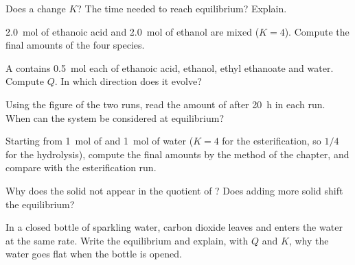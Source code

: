 \begin{exercise}[$\star$]\label{exo:g12:equilibrium:5}
Does a  change $K$? The time needed to reach equilibrium? Explain.
\end{exercise}

\begin{exercise}[$\star\star$]\label{exo:g12:equilibrium:6}
\qty{2.0}{mol} of ethanoic acid and \qty{2.0}{mol} of ethanol are mixed
($K = 4$). Compute the final amounts of the four species.
\end{exercise}

\begin{exercise}[$\star\star$]\label{exo:g12:equilibrium:7}
A  contains \qty{0.5}{mol} each of ethanoic acid, ethanol, ethyl
ethanoate and water. Compute $Q$. In which direction does it evolve?
\end{exercise}

\begin{exercise}[$\star\star$]\label{exo:g12:equilibrium:8}
Using the figure of the two runs, read the amount of  after
\qty{20}{h} in each run. When can the system be considered at
equilibrium?
\end{exercise}

\begin{exercise}[$\star\star$]\label{exo:g12:equilibrium:9}
Starting from \qty{1}{mol} of  and \qty{1}{mol} of water ($K = 4$
for the esterification, so $1/4$ for the hydrolysis), compute the final
amounts by the method of the chapter, and compare with the esterification
run.
\end{exercise}

\begin{exercise}[$\star\star$]\label{exo:g12:equilibrium:10}
Why does the solid not appear in the quotient of
? Does adding more solid shift the
equilibrium?
\end{exercise}

\begin{exercise}[$\star\star$]\label{exo:g12:equilibrium:11}
In a closed bottle of sparkling water, carbon dioxide leaves and enters
the water at the same rate. Write the equilibrium
 and explain, with $Q$ and $K$, why the water goes
flat when the bottle is opened.
\end{exercise}

